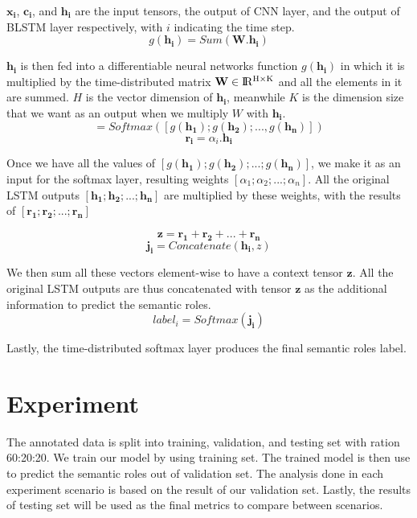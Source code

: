 $\mathbf{x_{i}}$, $\mathbf{c_{i}}$, and $\mathbf{h_{i}}$ are the input tensors, the output of CNN layer, and the output of BLSTM layer respectively, with $i$ indicating the time step. 
\begin{equation}
\label{sum_weight}
g(\mathbf{h_{i}}) = Sum(\mathbf{W}.\mathbf{h_{i}})
\end{equation}

$\mathbf{h_{i}}$ is then fed into a differentiable neural networks function $g(\mathbf{h_{i}})$ in which it is multiplied by the time-distributed matrix $\textbf{W} \in {\rm I\!R^{H \times K}}$ and all the elements in it are summed. $H$ is the vector dimension of $\mathbf{h_{i}}$, meanwhile $K$ is the dimension size that we want as an output when we multiply \textbf{$W$} with $\mathbf{h_{i}}$.
\begin{equation}
[\alpha_{1}, \alpha_{2}, ..., \alpha_{n}] = Softmax([g(\mathbf{h_{1}}); g(\mathbf{h_{2}}); ..., g(\mathbf{h_{n}})])
\end{equation}
\begin{equation}
\mathbf{r_{i}} = \alpha_{i}.\mathbf{h_{i}}
\end{equation}

Once we have all the values of $[g(\mathbf{h_{1}}); g(\mathbf{h_{2}}); ...; g(\mathbf{h_{n}})]$, we make it as an input for the softmax layer, resulting weights $[\alpha_{1}; \alpha_{2}; ...; \alpha_{n}]$. All the original LSTM outputs $[\mathbf{h_{1}}; \mathbf{h_{2}}; ...; \mathbf{h_{n}}]$ are multiplied by these weights, with the results of $[\mathbf{r_{1}}; \mathbf{r_{2}}; ...; \mathbf{r_{n}}]$

\begin{equation}
\mathbf{z} = \mathbf{r_{1}} + \mathbf{r_{2}} + ... + \mathbf{r_{n}}
\end{equation}
\begin{equation}
\mathbf{j_{i}} = Concatenate(\mathbf{h_{i}}, z)
\end{equation}

We then sum all these vectors element-wise to have a context tensor $\mathbf{z}$. 
All the original LSTM outputs are thus concatenated with tensor $\mathbf{z}$ as the additional information to predict the semantic roles.
\begin{equation}
label_{i} = Softmax(\mathbf{j_{i}})
\end{equation}

Lastly, the time-distributed softmax layer produces the final semantic roles label.

\section{Experiment}
The annotated data is split into training, validation, and testing set with ration 60:20:20. We train our model by using training set. The trained model is then use to predict the semantic roles out of validation set. The analysis done in each experiment scenario is based on the result of our validation set. Lastly, the results of testing set will be used as the final metrics to compare between scenarios.


